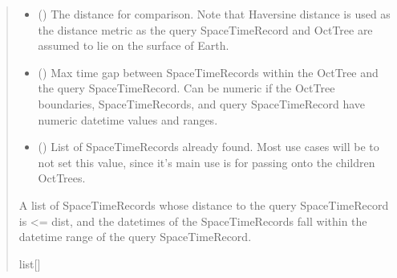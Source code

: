 \documentclass[letterpaper,10pt,english]{sphinxmanual}
\begin{document}
\begin{fulllineitems}
\begin{fulllineitems}
\begin{quote}
\begin{description}
\begin{itemize}
\item {}
\sphinxAtStartPar
{} () \textendash{} The distance for comparison. Note that Haversine distance is used
as the distance metric as the query SpaceTimeRecord and OctTree are
assumed to lie on the surface of Earth.

\item {}
\sphinxAtStartPar
{} () \textendash{} Max time gap between SpaceTimeRecords within the OctTree and the
query SpaceTimeRecord. Can be numeric if the OctTree boundaries,
SpaceTimeRecords, and query SpaceTimeRecord have numeric datetime
values and ranges.

\item {}
\sphinxAtStartPar
{} (\sphinxstyleliteralemphasis{\sphinxupquote{{[}}}{\hyperref[\detokenize{record:GeoSpatialTools.record.SpaceTimeRecord}]{\sphinxcrossref{\sphinxstyleliteralemphasis{\sphinxupquote{SpaceTimeRecord}}}}}\sphinxstyleliteralemphasis{\sphinxupquote{{]} }}\sphinxstyleliteralemphasis{\sphinxupquote{| }}) \textendash{} List of SpaceTimeRecords already found. Most use cases will be to
not set this value, since it’s main use is for passing onto the
children OctTrees.

\end{itemize}

\sphinxAtStartPar
A list of SpaceTimeRecords whose distance to the
query SpaceTimeRecord is \textless{}= dist, and the datetimes of the
SpaceTimeRecords fall within the datetime range of the query
SpaceTimeRecord.

\sphinxAtStartPar
list{[}{\hyperref[\detokenize{record:GeoSpatialTools.record.SpaceTimeRecord}]{}}{]}

\end{description}\end{quote}

\end{fulllineitems}



\end{fulllineitems}
\end{document}
